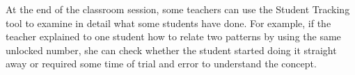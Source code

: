 At the end of the classroom session, some teachers can use the Student
Tracking tool to examine in detail what some students have done. For
example, if the teacher explained to one student how to relate two
patterns by using the same unlocked number, she can check whether the
student started doing it straight away or required some time of trial
and error to understand the concept.

